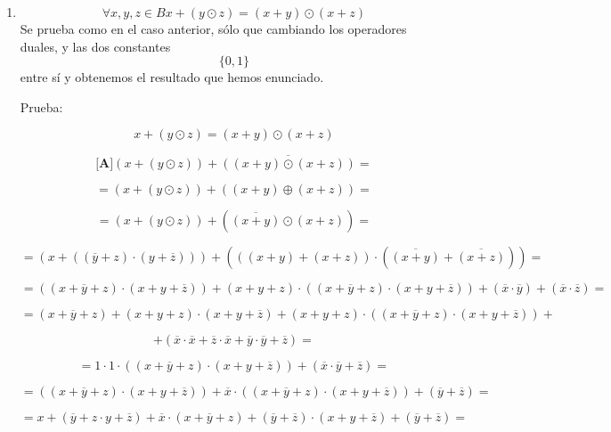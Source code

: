 \documentclass[
]{article}
\begin{document}
\begin{enumerate}
\begin{enumerate}
\begin{enumerate}
\begin{enumerate}
        Es seguro que la prueba anterior puede ser acortada
        drásticamente, así que si al\-guno encuentra una forma (quizás
        más directa) la pondremos en su lugar.
      \item
        \[\forall x,y,{z \in B}{{x + {({y \odot z})}} = {({x + y})}} \odot {({x + z})}\]Se
        prueba como en el caso anterior, sólo que cambiando los
        operadores duales, y las dos constantes \[\{{0,1}\}\] entre sí y
        obtenemos el resultado que hemos enunciado.

        Prueba:

        \[{{x + {({y \odot z})}} = {({x + y})}} \odot {({x + z})}\]

        \[{\lbrack\mathbf{A}\rbrack}{{{({x + {({y \odot z})}})} + \overline{({{({x+y})}\odot{({x+z})}})}} =}\]

        \[{= {{({x + {({y \odot z})}})} + {({{({x + y})} \oplus {({x + z})}})}}} =\]

        \[{= {{({x + {({y \odot z})}})} + {({\overline{({x+y})} \odot {({x + z})}})}}} =\]

        \[{= {{({x + {({{({\overline{y} + z})} \cdot {({y + \overline{z}})}})}})} + {({{({{({x + y})} + {({x + z})}})} \cdot {({\overline{({x+y})} + \overline{({x+z})}})}})}}} =\]

        \[{= {{{{({{({{x + \overline{y}} + z})} \cdot {({{x + y} + \overline{z}})}})} + {{({{x + y} + z})} \cdot {({{({{x + \overline{y}} + z})} \cdot {({{x + y} + \overline{z}})}})}}} + {({\overline{x} \cdot \overline{y}})}} + {({\overline{x} \cdot \overline{z}})}}} =\]

        \[= {{{{({{x + \overline{y}} + z})} + {{({{x + y} + z})} \cdot {({{x + y} + \overline{z}})}}} + {{({{x + y} + z})} \cdot {({{({{x + \overline{y}} + z})} \cdot {({{x + y} + \overline{z}})}})}}} +}\]

        \[{+ {({{{{\overline{x} \cdot \overline{x}} + {\overline{z} \cdot \overline{x}}} + {\overline{y} \cdot \overline{y}}} + \overline{z}})}} =\]

        \[{= {{{1 \cdot 1} \cdot {({{({{x + \overline{y}} + z})} \cdot {({{x + y} + \overline{z}})}})}} + {({{\overline{x} \cdot \overline{y}} + \overline{z}})}}} =\]

        \[{= {{{({{({{x + \overline{y}} + z})} \cdot {({{x + y} + \overline{z}})}})} + {\overline{x} \cdot {({{({{x + \overline{y}} + z})} \cdot {({{x + y} + \overline{z}})}})}}} + {({\overline{y} + \overline{z}})}}} =\]

        \[{= {{{{x + {({{\overline{y} + {z \cdot y}} + \overline{z}})}} + {\overline{x} \cdot {({{x + \overline{y}} + z})}}} + {{({\overline{y} + \overline{z}})} \cdot {({{x + y} + \overline{z}})}}} + {({\overline{y} + \overline{z}})}}} =\]


\end{enumerate}
\end{enumerate}
\end{enumerate}
\end{enumerate}
\end{document}
